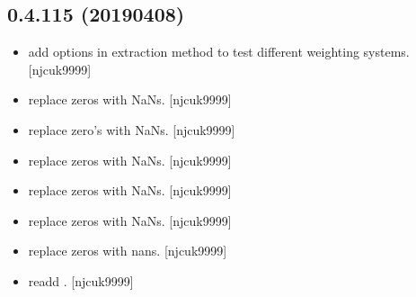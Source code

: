 \documentclass[a4paper,10pt,english]{report}
\begin{document}
\subsection{0.4.115 (2019\sphinxhyphen{}04\sphinxhyphen{}08)}
\label{\detokenize{misc/changelog:id164}}\begin{itemize}
\item {} 
 \sphinxhyphen{} add options in extraction method to test different
weighting systems. {[}njcuk9999{]}

\item {} 
 \sphinxhyphen{} replace zeros with NaNs. {[}njcuk9999{]}

\item {} 
 \sphinxhyphen{} replace zero’s with NaNs. {[}njcuk9999{]}

\item {} 
 \sphinxhyphen{} replace zeros with NaNs. {[}njcuk9999{]}

\item {} 
 \sphinxhyphen{} replace zeros with NaNs. {[}njcuk9999{]}

\item {} 
 \sphinxhyphen{} replace zeros with NaNs. {[}njcuk9999{]}

\item {} 
 \sphinxhyphen{} replace zeros with nans. {[}njcuk9999{]}

\item {} 
 \sphinxhyphen{} readd . {[}njcuk9999{]}

\end{itemize}
\end{document}
